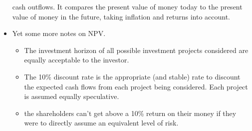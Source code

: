 \documentclass[twocolumn]{article}
\begin{document}
\begin{itemize}
  cash outflows. It compares the present value of money today to the
  present value of money in the future, taking inflation and returns
  into account. 
\item Yet some more notes on NPV.
  \begin{itemize}
  \item The investment horizon of all possible investment projects
    considered are equally acceptable to the investor.
  \item The 10\% discount rate is the appropriate (and stable) rate to
    discount the expected cash flows from each project being
    considered. Each project is assumed equally speculative. 
  \item the shareholders can't get above a 10\% return on their money
    if they were to directly assume an equivalent level of risk.  
  \end{itemize}
\end{itemize}
\end{document}
